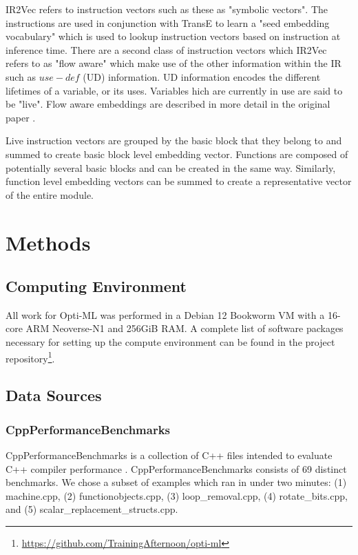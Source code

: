\documentclass[nohyperref]{article}
\theoremstyle{plain}
\theoremstyle{definition}
\theoremstyle{remark}
\begin{document}
IR2Vec refers to instruction vectors such as these as "symbolic vectors". The instructions are used in conjunction with TransE to learn a "seed embedding vocabulary" which is used to lookup instruction vectors based on instruction at inference time. There are a second class of instruction vectors which IR2Vec refers to as "flow aware" which make use of the other information within the IR such as $use-def$ (UD) information. UD information encodes the different lifetimes of a variable, or its uses. Variables hich are currently in use are said to be "live". Flow aware embeddings are described in more detail in the original paper \cite{ir2vec}.

Live instruction vectors are grouped by the basic block that they belong to and summed to create basic block level embedding vector. Functions are composed of potentially several basic blocks and can be created in the same way. Similarly, function level embedding vectors can be summed to create a representative vector of the entire module.



\section{Methods}
\label{methods}
\subsection{Computing Environment}
All work for Opti-ML was performed in a Debian 12 Bookworm VM with a 16-core ARM Neoverse-N1 and 256GiB RAM. A complete list of software packages necessary for setting up the compute environment can be found in the project repository\footnote{\href{https://github.com/TrainingAfternoon/opti-ml}{https://github.com/TrainingAfternoon/opti-ml}}.

\subsection{Data Sources}
\subsubsection{CppPerformanceBenchmarks}
CppPerformanceBenchmarks is a collection of C++ files intended to evaluate C++ compiler performance \cite{cpp-perf-benchmarks}. CppPerformanceBenchmarks consists of 69 distinct benchmarks. We chose a subset of examples which ran in under two minutes: (1) machine.cpp, (2) functionobjects.cpp, (3) loop\_removal.cpp, (4) rotate\_bits.cpp, and (5) scalar\_replacement\_structs.cpp.
\end{document}
